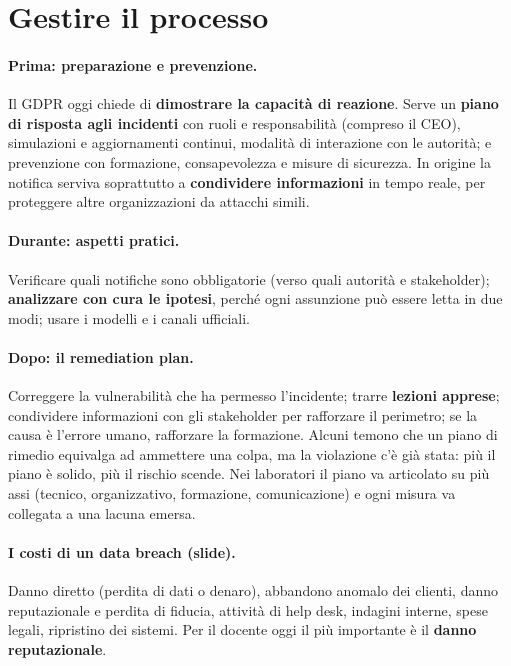 \section{Gestire il processo}
\label{sec:breach-processo}

\paragraph{Prima: preparazione e prevenzione.} Il GDPR oggi chiede di \textbf{dimostrare la capacità di
reazione}. Serve un \textbf{piano di risposta agli incidenti} con ruoli e responsabilità (compreso il
CEO), simulazioni e aggiornamenti continui, modalità di interazione con le autorità; e prevenzione con
formazione, consapevolezza e misure di sicurezza. In origine la notifica serviva soprattutto a
\textbf{condividere informazioni} in tempo reale, per proteggere altre organizzazioni da attacchi simili.

\paragraph{Durante: aspetti pratici.} Verificare quali notifiche sono obbligatorie (verso quali autorità
e stakeholder); \textbf{analizzare con cura le ipotesi}, perché ogni assunzione può essere letta in due
modi; usare i modelli e i canali ufficiali.

\paragraph{Dopo: il remediation plan.} Correggere la vulnerabilità che ha permesso l'incidente; trarre
\textbf{lezioni apprese}; condividere informazioni con gli stakeholder per rafforzare il perimetro; se la
causa è l'errore umano, rafforzare la formazione. Alcuni temono che un piano di rimedio equivalga ad
ammettere una colpa, ma la violazione c'è già stata: più il piano è solido, più il rischio scende. Nei
laboratori il piano va articolato su più assi (tecnico, organizzativo, formazione, comunicazione) e ogni
misura va collegata a una lacuna emersa.

\paragraph{I costi di un data breach (slide).} Danno diretto (perdita di dati o denaro), abbandono
anomalo dei clienti, danno reputazionale e perdita di fiducia, attività di help desk, indagini interne,
spese legali, ripristino dei sistemi. Per il docente oggi il più importante è il \textbf{danno
reputazionale}.

